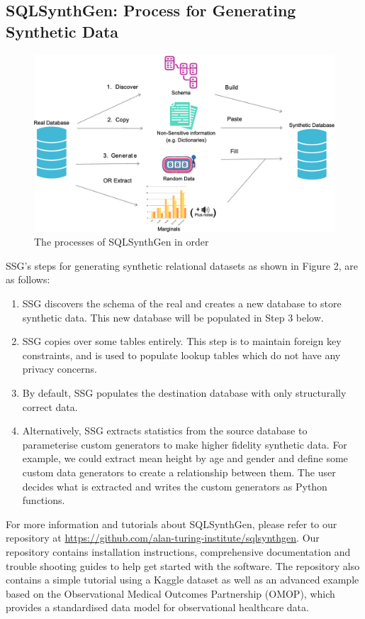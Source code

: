\documentclass[11pt]{article}
\begin{document}
\subsection{SQLSynthGen: Process for Generating Synthetic Data}

\begin{figure}[ht]
\centering
\includegraphics[width=0.8\linewidth]{figures/SSG.png}
\caption{The processes of SQLSynthGen in order}
\label{fig:Range of fidelity for synthetic data}
\end{figure}

SSG's steps for generating synthetic relational datasets as shown in Figure 2, are as follows:

\begin{enumerate}
    \item SSG discovers the schema of the real and creates a new database to store synthetic data. This new database will be populated in Step 3 below. 
    \item SSG copies over some tables entirely. This step is to maintain foreign key constraints, and is used to populate lookup tables which do not have any privacy concerns.
    \item By default, SSG populates the destination database with only structurally correct data. \item Alternatively, SSG extracts statistics from the source database to parameterise custom generators to make higher fidelity synthetic data. For example, we could extract mean height by age and gender and define some custom data generators to create a relationship between them. The user decides what is extracted and writes the custom generators as Python functions.
\end{enumerate}

For more information and tutorials about SQLSynthGen, please refer to our repository at \url{https://github.com/alan-turing-institute/sqlsynthgen}. Our repository \cite{repository} contains installation instructions, comprehensive documentation and trouble shooting guides to help get started with the software. The repository also contains a simple tutorial using a Kaggle dataset \cite{airbnb} as well as an advanced example based on the Observational Medical Outcomes Partnership (OMOP)\cite{omop}, which provides a standardised data model for observational healthcare data. 
\end{document}
